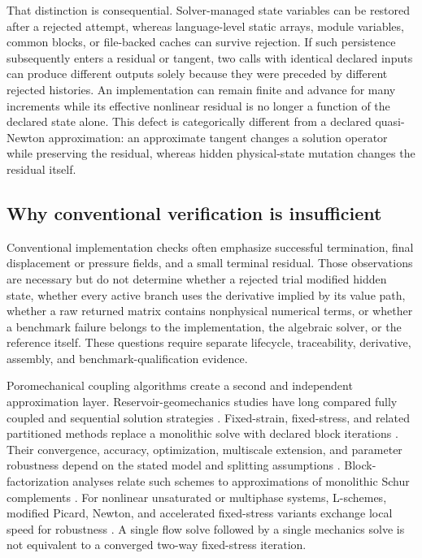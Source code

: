 \documentclass[preprint,12pt,authoryear]{elsarticle}
\begin{document}
That distinction is consequential. Solver-managed state variables can be restored after a rejected attempt, whereas language-level static arrays, module variables, common blocks, or file-backed caches can survive rejection. If such persistence subsequently enters a residual or tangent, two calls with identical declared inputs can produce different outputs solely because they were preceded by different rejected histories. An implementation can remain finite and advance for many increments while its effective nonlinear residual is no longer a function of the declared state alone. This defect is categorically different from a declared quasi-Newton approximation: an approximate tangent changes a solution operator while preserving the residual, whereas hidden physical-state mutation changes the residual itself.

\subsection{Why conventional verification is insufficient}

Conventional implementation checks often emphasize successful termination, final displacement or pressure fields, and a small terminal residual. Those observations are necessary but do not determine whether a rejected trial modified hidden state, whether every active branch uses the derivative implied by its value path, whether a raw returned matrix contains nonphysical numerical terms, or whether a benchmark failure belongs to the implementation, the algebraic solver, or the reference itself. These questions require separate lifecycle, traceability, derivative, assembly, and benchmark-qualification evidence.

Poromechanical coupling algorithms create a second and independent approximation layer. Reservoir-geomechanics studies have long compared fully coupled and sequential solution strategies \citep{settari1998,settari2001,dean2006}. Fixed-strain, fixed-stress, and related partitioned methods replace a monolithic solve with declared block iterations \citep{kim2011,castelletto2013,mikelic2013,white2016}. Their convergence, accuracy, optimization, multiscale extension, and parameter robustness depend on the stated model and splitting assumptions \citep{castelletto2015,dana2018,storvik2019,hong2020}. Block-factorization analyses relate such schemes to approximations of monolithic Schur complements \citep{white2016}. For nonlinear unsaturated or multiphase systems, L-schemes, modified Picard, Newton, and accelerated fixed-stress variants exchange local speed for robustness \citep{both2019}. A single flow solve followed by a single mechanics solve is not equivalent to a converged two-way fixed-stress iteration.
\end{document}

